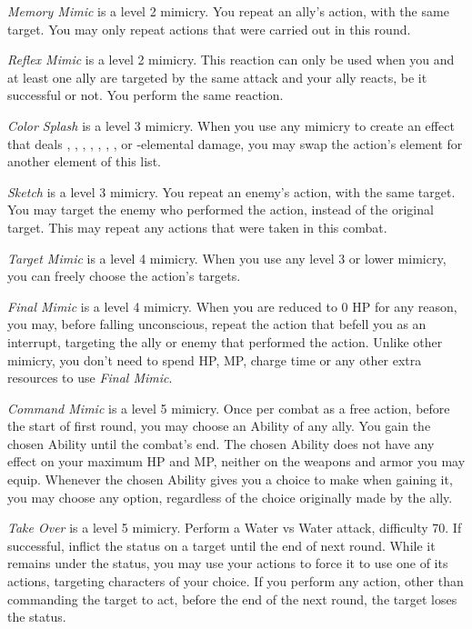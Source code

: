 \begin{multicols}{2}
    \textit{Memory Mimic} is a level 2 mimicry. You repeat an ally’s action, with the same target. You may only repeat actions that were carried out in this round.

	\textit{Reflex Mimic} is a level 2 mimicry. This reaction can only be used when you and at least one ally are targeted by the same attack and your ally reacts, be it successful or not. You perform the same reaction.
    
    \textit{Color Splash} is a level 3 mimicry. When you use any mimicry to create an effect that deals , , , , , , ,  or -elemental damage, you may swap the action’s element for another element of this list.
    
    \textit{Sketch} is a level 3 mimicry. You repeat an enemy’s action, with the same target. You may target the enemy who performed the action, instead of the original target. This may repeat any actions that were taken in this combat.
    
    \textit{Target Mimic} is a level 4 mimicry. When you use any level 3 or lower mimicry, you can freely choose the action’s targets.
	
	\textit{Final Mimic} is a level 4 mimicry. When you are reduced to 0 HP for any reason, you may, before falling unconscious, repeat the action that befell you as an interrupt, targeting the ally or enemy that performed the action.  Unlike other mimicry, you don't need to spend HP, MP, charge time or any other extra resources to use \textit{Final Mimic}.
    
    \textit{Command Mimic} is a level 5 mimicry. Once per combat as a free action, before the start of first round, you may choose an Ability of any ally. You gain the chosen Ability until the combat’s end. The chosen Ability does not have any effect on your maximum HP and MP, neither on the weapons and armor you may equip. Whenever the chosen Ability gives you a choice to make when gaining it, you may choose any option, regardless of the choice originally made by the ally.
    
    \textit{Take Over} is a level 5 mimicry. Perform a Water vs Water attack, difficulty 70. If successful, inflict the  status on a target until the end of next round. While it remains under the  status, you may use your actions to force it to use one of its actions, targeting characters of your choice. If you perform any action, other than commanding the target to act, before the end of the next round, the target loses the  status.
\end{multicols}
\begin{center}
\end{center}
